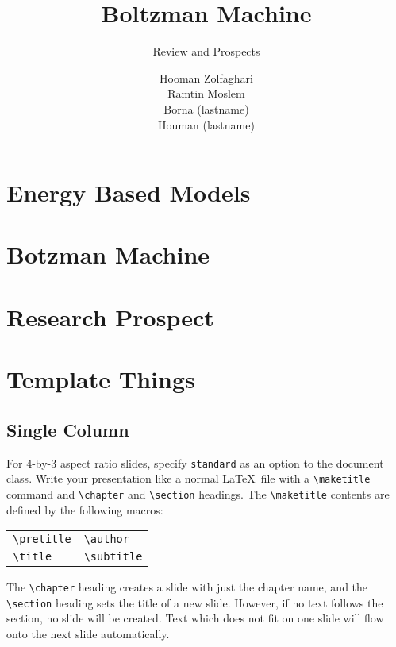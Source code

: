 \documentclass{antclass}
\title{Boltzman Machine}
\subtitle{Review and Prospects}
\author{Hooman Zolfaghari \\ Ramtin Moslem \\ Borna (lastname) \\ Houman (lastname)}
\begin{document}
\maketitle

\chapter{Energy Based Models}

\chapter{Botzman Machine}

\chapter{Research Prospect}

\chapter{Template Things}
\section{Single Column}

For 4-by-3 aspect ratio slides, specify \verb|standard| as an option to the
document class. Write your presentation like a normal \LaTeX\ file with a
\verb|\maketitle| command and \verb|\chapter| and \verb|\section| headings. The
\verb|\maketitle| contents are defined by the following macros:
\begin{center}
    \begin{tabular}{l@{\qquad}l}
        \verb|\pretitle| &
        \verb|\author| \\
        \verb|\title| &
        \verb|\subtitle|
    \end{tabular}
\end{center}
The \verb|\chapter| heading creates a slide with just the chapter name, and the
\verb|\section| heading sets the title of a new slide. However, if no text
follows the section, no slide will be created. Text which does not fit on one
slide will flow onto the next slide automatically.
\end{document}
